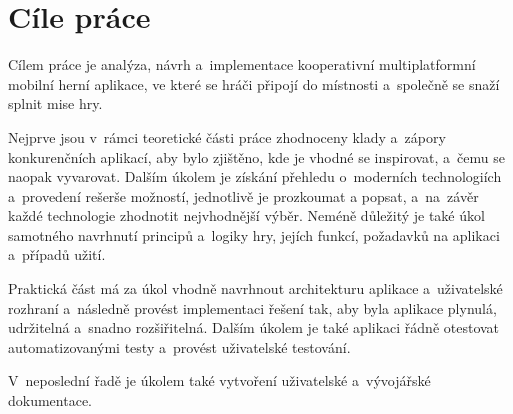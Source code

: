 \chapter{Cíle práce}
\label{chap:goals}

Cílem práce je analýza, návrh a~implementace
kooperativní multiplatformní mobilní herní aplikace,
ve které se hráči připojí do místnosti a~společně se snaží splnit mise hry.

Nejprve jsou v~rámci teoretické části práce zhodnoceny klady a~zápory
konkurenčních aplikací,
aby bylo zjištěno,
kde je vhodné se inspirovat, a~čemu se naopak vyvarovat.
Dalším úkolem je získání přehledu o~moderních technologiích
a~provedení rešerše možností, jednotlivě je prozkoumat a popsat,
a~na~závěr každé technologie zhodnotit nejvhodnější výběr.
Neméně důležitý je také úkol samotného navrhnutí principů a~logiky hry,
jejích funkcí, požadavků na aplikaci a~případů užití.

Praktická část má za úkol vhodně navrhnout architekturu aplikace
a~uživatelské rozhraní a~následně provést implementaci řešení tak,
aby byla aplikace plynulá, udržitelná a~snadno rozšiřitelná.
Dalším úkolem je také aplikaci řádně otestovat automatizovanými testy 
a~provést uživatelské testování.

V~neposlední řadě je úkolem také vytvoření uživatelské a~vývojářské
dokumentace.
